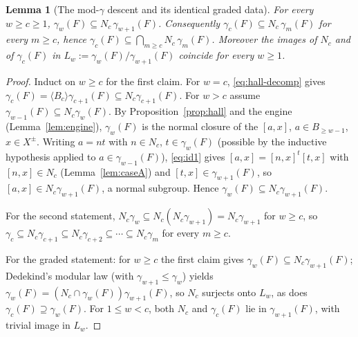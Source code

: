 \documentclass{amsart}
\newtheorem{lemma}{Lemma}
\theoremstyle{definition}
\theoremstyle{remark}
\begin{document}
\begin{lemma}[The mod-$\gamma$ descent and its identical graded data]\label{lem:moddescent}
For every $w\ge c\ge1$, $\gamma_w(F)\subseteq N_c\,\gamma_{w+1}(F)$. Consequently
$\gamma_c(F)\subseteq N_c\,\gamma_m(F)$ for every $m\ge c$, hence
$\gamma_c(F)\subseteq\bigcap_{m\ge c}N_c\,\gamma_m(F)$. Moreover the images of $N_c$
and of $\gamma_c(F)$ in $L_w:=\gamma_w(F)/\gamma_{w+1}(F)$ coincide for every $w\ge1$.
\end{lemma}
\begin{proof}
Induct on $w\ge c$ for the first claim. For $w=c$, \eqref{eq:hall-decomp} gives
$\gamma_c(F)=\langle B_c\rangle\gamma_{c+1}(F)\subseteq N_c\gamma_{c+1}(F)$. For
$w>c$ assume $\gamma_{w-1}(F)\subseteq N_c\gamma_w(F)$. By
Proposition~\ref{prop:hall} and the engine (Lemma~\ref{lem:engine}), $\gamma_w(F)$
is the normal closure of the $[a,x]$, $a\in B_{\ge w-1}$, $x\in X^{\pm}$. Writing
$a=nt$ with $n\in N_c$, $t\in\gamma_w(F)$ (possible by the inductive hypothesis
applied to $a\in\gamma_{w-1}(F)$), \eqref{eq:id1} gives $[a,x]=[n,x]^t[t,x]$ with
$[n,x]\in N_c$ (Lemma~\ref{lem:caseA}) and $[t,x]\in\gamma_{w+1}(F)$, so
$[a,x]\in N_c\gamma_{w+1}(F)$, a normal subgroup. Hence
$\gamma_w(F)\subseteq N_c\gamma_{w+1}(F)$.

For the second statement, $N_c\gamma_w\subseteq N_c(N_c\gamma_{w+1})=N_c\gamma_{w+1}$
for $w\ge c$, so $\gamma_c\subseteq N_c\gamma_{c+1}\subseteq N_c\gamma_{c+2}\subseteq
\cdots\subseteq N_c\gamma_m$ for every $m\ge c$.

For the graded statement: for $w\ge c$ the first claim gives $\gamma_w(F)\subseteq
N_c\gamma_{w+1}(F)$; Dedekind's modular law (with $\gamma_{w+1}\le\gamma_w$) yields
$\gamma_w(F)=(N_c\cap\gamma_w(F))\gamma_{w+1}(F)$, so $N_c$ surjects onto $L_w$, as
does $\gamma_c(F)\supseteq\gamma_w(F)$. For $1\le w<c$, both $N_c$ and $\gamma_c(F)$
lie in $\gamma_{w+1}(F)$, with trivial image in $L_w$.
\end{proof}
\end{document}
